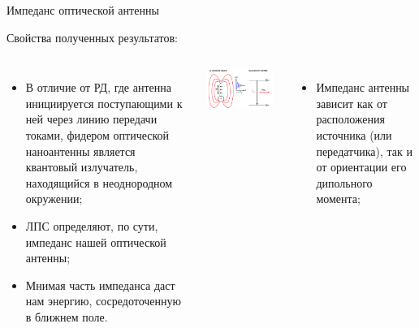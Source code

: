 \documentclass[9pt, compress, xcolor=table]{beamer}
\begin{document}
\begin{frame}{Импеданс оптической антенны}

\textcolor{red!50!black}{Свойства полученных результатов:}

\begin{columns}
\column{6.5cm}
\begin{itemize}
\item В отличие от РД, где антенна инициируется поступающими к ней через линию передачи токами, фидером оптической наноантенны является квантовый излучатель, находящийся в неоднородном окружении;
\item ЛПС определяют, по сути, импеданс нашей оптической антенны;
\item Мнимая часть импеданса даст нам энергию, сосредоточенную в ближнем поле.
\end{itemize}
\column{6cm}
\begin{center}
\includegraphics[width=0.9\textwidth]{optant63}
\end{center}

\begin{itemize}
\item  Импеданс антенны зависит как от расположения источника (или передатчика),
    так и от ориентации его дипольного момента;
\end{itemize}

\end{columns}
\end{frame}
\end{document}

